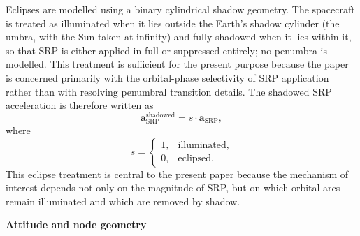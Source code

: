 \vspace{5pt}
\par\noindent Eclipses are modelled using a binary cylindrical shadow geometry. The spacecraft is treated as illuminated when it lies outside the Earth's shadow cylinder (the umbra, with the Sun taken at infinity) and fully shadowed when it lies within it, so that SRP is either applied in full or suppressed entirely; no penumbra is modelled. This treatment is sufficient for the present purpose because the paper is concerned primarily with the orbital-phase selectivity of SRP application rather than with resolving penumbral transition details. The shadowed SRP acceleration is therefore written as
\begin{equation}
\mathbf{a}_{\text{SRP}}^{\text{shadowed}} = s \cdot \mathbf{a}_{\text{SRP}},
\end{equation}
where
\[
s =
\begin{cases}
1, & \text{illuminated},\\
0, & \text{eclipsed}.
\end{cases}
\]
This eclipse treatment is central to the present paper because the mechanism of interest depends not only on the magnitude of SRP, but on which orbital arcs remain illuminated and which are removed by shadow.

\vspace{5pt}
\vspace{7pt}
\noindent\textbf{Attitude and node geometry} \vspace{2pt}

